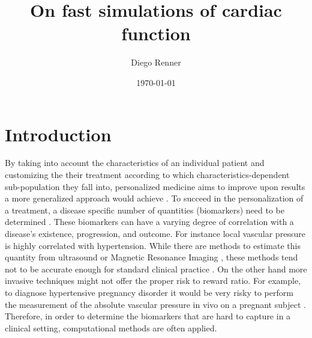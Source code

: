 \documentclass[a4paper, oneside]{discothesis}
\title{On fast simulations of cardiac function}
\author{Diego Renner}
\institute{Dep. of Mathematics \\[2pt]
ETH Zürich}
\date{\today}
\begin{document}
\frontmatter %
\maketitle
\cleardoublepage

\begin{acknowledgements}

\end{acknowledgements}


\begin{abstract}

\end{abstract}

\tableofcontents

\mainmatter %

\chapter{Introduction}

By taking into account the characteristics of an individual patient and customizing the their treatment according to which characteristics-dependent sub-population they fall into, personalized medicine aims to improve upon results a more generalized approach would achieve \cite{ashley2016towards,national2011toward,giardino2017role}.
To succeed in the personalization of a treatment, a disease specific number of quantities (biomarkers) need to be determined \cite{burke1998integrating}.
These biomarkers can have a varying degree of correlation with a disease's existence, progression, and outcome.
For instance local vascular pressure is highly correlated with hypertension.
While there are methods to estimate this quantity from ultrasound or Magnetic Resonance Imaging \cite{markl20124d}, these methods tend not to be accurate enough for standard clinical practice \cite{everett2012beyond}.
On the other hand more invasive techniques might not offer the proper risk to reward ratio.
For example, to diagnose hypertensive pregnancy disorder it would be very risky to perform the measurement of the absolute vascular pressure in vivo on a pregnant subject \cite{kett2002adverse}.
Therefore, in order to determine the biomarkers that are hard to capture in a clinical setting, computational methods are often applied.
\end{document}
